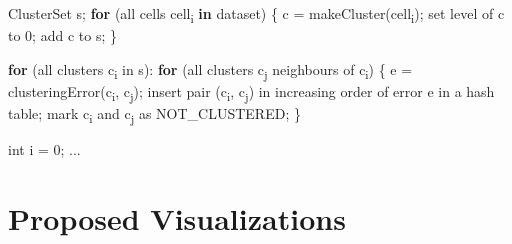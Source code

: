 \begin{code}[commandchars=\\\{\}]
ClusterSet s;
\textbf{for} (all cells cell\textsubscript{i} \textbf{in} dataset)
\{
	c = makeCluster(cell\textsubscript{i});
    set level of c to 0;
    add c to s;
\}

\textbf{for} (all clusters c\textsubscript{i} in s):
	\textbf{for} (all clusters c\textsubscript{j} neighbours of c\textsubscript{i})
	\{
		e = clusteringError(c\textsubscript{i}, c\textsubscript{j});
        insert pair (c\textsubscript{i}, c\textsubscript{j}) in increasing order of error e in a hash table;
        mark c\textsubscript{i} and c\textsubscript{j} as NOT_CLUSTERED;
	\}
    
int i = 0;
...

\end{code}
\section{Proposed Visualizations}